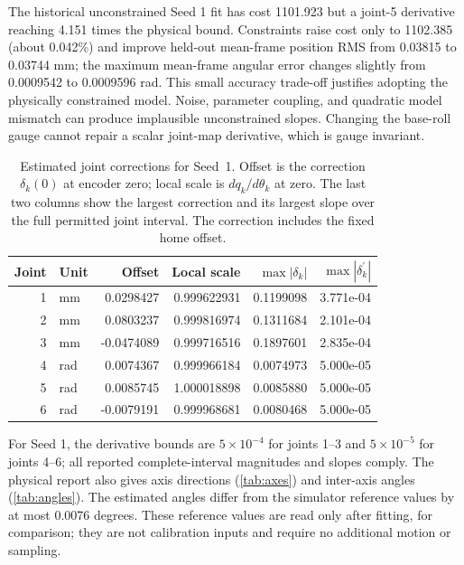 \documentclass[11pt,letterpaper]{article}
\begin{document}
The historical unconstrained Seed 1 fit has cost 1101.923 but a joint-5 derivative reaching 4.151 times the physical bound. Constraints raise cost only to 1102.385 (about 0.042\%) and improve held-out mean-frame position RMS from 0.03815 to 0.03744 mm; the maximum mean-frame angular error changes slightly from 0.0009542 to 0.0009596 rad. This small accuracy trade-off justifies adopting the physically constrained model. Noise, parameter coupling, and quadratic model mismatch can produce implausible unconstrained slopes. Changing the base-roll gauge cannot repair a scalar joint-map derivative, which is gauge invariant.

\begin{table}[!htbp]\centering\small
\caption{Estimated joint corrections for Seed~1. Offset is the correction $\delta_k(0)$ at encoder zero; local scale is $dq_k/d\theta_k$ at zero. The last two columns show the largest correction and its largest slope over the full permitted joint interval. The correction includes the fixed home offset.}\label{tab:parameters}
\begin{tabular}{@{}rlrrrr@{}}\toprule
Joint & Unit & Offset & Local scale & $\max|\delta_k|$ & $\max|\delta_k^\prime|$\\\midrule
1 & mm & 0.0298427 & 0.999622931 & 0.1199098 & 3.771e-04\\
2 & mm & 0.0803237 & 0.999816974 & 0.1311684 & 2.101e-04\\
3 & mm & -0.0474089 & 0.999716516 & 0.1897601 & 2.835e-04\\
4 & rad & 0.0074367 & 0.999966184 & 0.0074973 & 5.000e-05\\
5 & rad & 0.0085745 & 1.000018898 & 0.0085880 & 5.000e-05\\
6 & rad & -0.0079191 & 0.999968681 & 0.0080468 & 5.000e-05\\
\bottomrule\end{tabular}
\end{table}
For Seed 1, the derivative bounds are $5\times10^{-4}$ for joints 1--3 and $5\times10^{-5}$ for joints 4--6; all reported complete-interval magnitudes and slopes comply. The physical report also gives axis directions (\cref{tab:axes}) and inter-axis angles (\cref{tab:angles}). The estimated angles differ from the simulator reference values by at most 0.0076 degrees. These reference values are read only after fitting, for comparison; they are not calibration inputs and require no additional motion or sampling.
\end{document}
